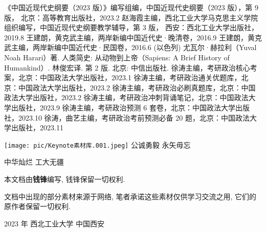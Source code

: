 \documentclass[10pt, UTF8]{ctexbook} %
\begin{document}
\newpage
\thispagestyle{empty}
\begin{thebibliography}{1}
    《中国近现代史纲要（2023 版）》编写组编，中国近现代史纲要（2023 版），第 9 版，
    北京：高等教育出版社，2023.2
    赵海霞主编，西北工业大学马克思主义学院组织编写，中国近现代史纲要教学辅导，第 3 版，
    西安：西北工业大学出版社，2019.8
    王建朗，黄克武主编，两岸新编中国近代史·晚清卷，2016.9
    王建朗，黄克武主编，两岸新编中国近代史·民国卷，2016.6
    (以色列) 尤瓦尔·赫拉利（Yuval Noah Harari）著. 人类简史: 从动物到上帝（Sapiens: A Brief History
    of Humankind）. 林俊宏译. 第 2 版.
    北京: 中信出版社.
    徐涛主编，考研政治核心考案，北京：中国政法大学出版社，2023.1
    徐涛主编，考研政治通关优题库，北京：中国政法大学出版社，2023.2
    徐涛主编，考研政治必刷真题库，北京：中国政法大学出版社，2023.2
    徐涛主编，考研政治冲刺背诵笔记，北京：中国政法大学出版社，2023.9
    徐涛主编，考研政治预测 6 套卷，北京：中国政法大学出版社，2023.10
    徐涛，曲艺主编，考研政治考前预测必备 20 题，北京：中国政法大学出版社，2023.11
\end{thebibliography}




\newpage
\thispagestyle{empty}

\newpage
\cleardoublepage
\thispagestyle{empty}
\vspace*{3cm}
\begin{center}
    \texttt{[image: pic/Keynote素材库.001.jpeg]}
    \large
    公诚勇毅 \quad 永矢毋忘

    中华灿烂 \quad 工大无疆
\end{center}
\vspace*{7cm}
\begin{center}
    \small
    本文档由\textbf{钱锋}编写, 钱锋保留一切权利.

    文档中出现的部分素材来源于网络, 笔者承诺这些素材仅供学习交流之用, 
    它们的原作者保留一切权利.

    2023 年 \quad 西北工业大学 \quad 中国西安 
\end{center}
\end{document}
